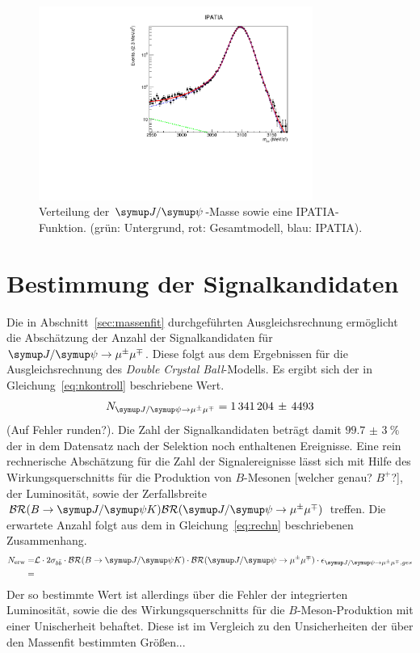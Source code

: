 %
\begin{figure}[H]
  \centering
      \includegraphics[width=0.8\textwidth]{Plots/IPATIAexp.pdf}
  \caption{Verteilung der $\jpsi$-Masse sowie eine IPATIA-Funktion. (grün: Untergrund, rot: Gesamtmodell, blau: IPATIA).}
  \label{fig:fit2}
\end{figure}
\section{Bestimmung der Signalkandidaten}
Die in Abschnitt~\ref{sec:massenfit} durchgeführten Ausgleichsrechnung ermöglicht die Abschätzung der Anzahl der Signalkandidaten für $\kontroll$. Diese folgt aus dem Ergebnissen für die Ausgleichsrechnung des \textit{Double Crystal Ball}-Modells. Es ergibt sich der in Gleichung~\eqref{eq:nkontroll} beschriebene Wert.
%
\begin{equation}
  N_{\kontroll}=1\,341\,204\,\pm\,4493
  \label{eq:nkontroll}
\end{equation}
%
(Auf Fehler runden?). Die Zahl der Signalkandidaten beträgt damit $\SI{99,7(3)}{\percent}$ der in dem Datensatz nach der Selektion noch enthaltenen Ereignisse.
Eine rein rechnerische Abschätzung für die Zahl der Signalereignisse lässt sich mit Hilfe des Wirkungsquerschnitts für die Produktion von $B$-Mesonen [welcher genau? $B^{+}$?], der Luminosität, sowie der Zerfallsbreite $\mathcal{BR}(B\rightarrow\jpsi K)\mathcal{BR}(\kontroll)$ treffen. Die erwartete Anzahl folgt aus dem in Gleichung~\eqref{eq:rechn} beschriebenen Zusammenhang.
%
\begin{equation}
  \begin{split}
    N_\text{erw}=&\mathcal{L}\cdot 2\sigma_{b\bar{b}}\cdot\mathcal{BR}(B\rightarrow\jpsi K)\cdot\mathcal{BR}(\kontroll)\cdot\epsilon_{\kontroll, ges}\\
    =&
  \end{split}
  \label{eq:rechn}
\end{equation}
%
Der so bestimmte Wert ist allerdings über die Fehler der integrierten Luminosität, sowie die des Wirkungsquerschnitts für die $B$-Meson-Produktion mit einer Unischerheit behaftet. Diese ist im Vergleich zu den Unsicherheiten der über den Massenfit bestimmten Größen...
